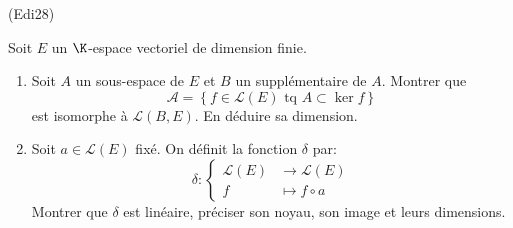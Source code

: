 \begin{tiny}(Edi28)\end{tiny} \label{exo: di28} Soit $E$ un $\K$-espace vectoriel de dimension finie.
\begin{enumerate}
 \item Soit $A$ un sous-espace de $E$ et $B$ un supplémentaire de $A$. Montrer que
\[
 \mathcal{A} = \left\lbrace f\in \mathcal{L}(E) \text{ tq } A \subset \ker f\right\rbrace
\]
est isomorphe à $\mathcal{L}(B,E)$. En déduire sa dimension.
 \item Soit $a\in \mathcal{L}(E)$ fixé. On définit la fonction $\delta$ par:
\begin{displaymath}
  \delta:
\left\lbrace 
\begin{aligned}
  \mathcal{L}(E) &\rightarrow \mathcal{L}(E) \\ f &\mapsto f \circ a
\end{aligned}
\right. 
\end{displaymath}
Montrer que $\delta$ est linéaire, préciser son noyau, son image et leurs dimensions.
\end{enumerate}
